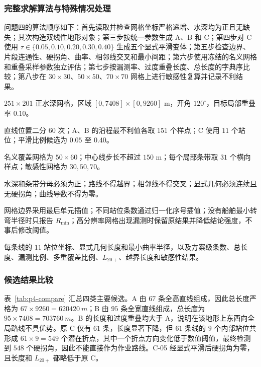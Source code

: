 \subsubsection{完整求解算法与特殊情况处理}
问题四的算法顺序如下：首先读取并检查网格坐标严格递增、水深均为正且无缺失；其次构造双线性地形对象；第三步按统一参数生成 A、B 和 C；第四步对 C 使用 $\tau\in\{0.05,0.10,0.20,0.30,0.40\}$ 生成五个显式平滑变体；第五步检查边界、片段连通性、硬拐角、曲率、相邻线交叉和最小间距；第六步使用冻结的名义网格和重叠采样参数独立评估；第七步按漏测率、过度重叠长度、总长度的字典序比较；第八步在 $30\times30$、$50\times50$、$70\times70$ 网格上进行敏感性复算并记录不利结果。

\begin{solvercontract}[问题四算法求解说明]
\item[输入] $251\times201$ 正水深网格，区域 $[0,7408]\times[0,9260]$ m，开角 $120^\circ$，目标局部重叠率 $0.10$。
\item[生成精度] 直线位置二分 $60$ 次；A、B 的沿程最不利值各取 $151$ 个样点；C 使用 $11$ 个站位；平滑比例候选为 $0.05$ 至 $0.40$。
\item[评估精度] 名义覆盖网格为 $50\times60$；中心线步长不超过 $150$ m；每个局部条带取 $31$ 个横向样点；敏感性网格为 $30,50,70$。
\item[可行性条件] 水深和条带分母必须为正；路线不得越界；相邻线不得交叉；显式几何必须连续且无硬拐角；曲线导数不得为零。
\item[特殊情况] 网格边界采用最后单元插值；不同站位条数通过归一化序号插值；没有船舶最小转弯半径时只报告 $R_{\min}$；高分辨率网格出现漏测时保留原结果并降低结论强度，不事后修改阈值。
\item[输出] 每条线的 $11$ 站位坐标、显式几何长度和最小曲率半径，以及方案级条数、总长度、漏测比例、多重覆盖比例、$L_{20+}$、越界长度和敏感性结果。
\end{solvercontract}

\subsubsection{候选结果比较}
表~\ref{tab:p4-compare} 汇总四类主要候选。A 由 $67$ 条全高直线组成，因此总长度严格为 $67\times9260=\SI{620420}{m}$；B 由 $95$ 条全宽直线组成，总长度为 $95\times7408=\SI{703760}{m}$。B 的长度和过度重叠均大于 A，说明在该地形上东西向全局路线不具优势。原 C 仅有 $61$ 条，长度显著下降，但 $61$ 条线的 $9$ 个内部站位共形成 $61\times9=549$ 个潜在折点，其中一个折点方向变化低于数值阈值，最终检测到 $548$ 个硬拐角，因此不能直接作为作业路线。C-05 经显式平滑后硬拐角为零，且长度和 $L_{20+}$ 都略低于原 C。

